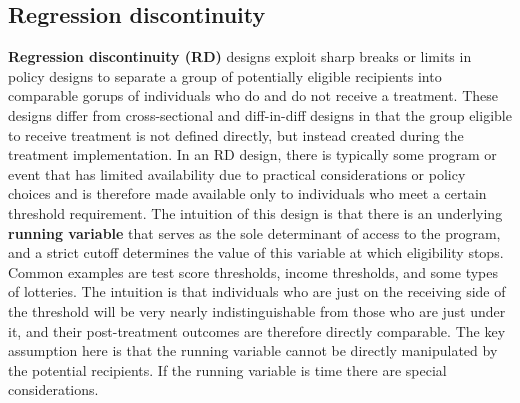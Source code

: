 \subsection{Regression discontinuity}

\textbf{Regression discontinuity (RD)} designs exploit sharp breaks or limits
in policy designs to separate a group of potentially eligible recipients
into comparable gorups of individuals who do and do not receive a treatment.
These designs differ from cross-sectional and diff-in-diff designs
in that the group eligible to receive treatment is not defined directly,
but instead created during the treatment implementation.
In an RD design, there is typically some program or event
that has limited availability due to practical considerations or policy choices
and is therefore made available only to individuals who meet a certain threshold requirement.
The intuition of this design is that there is an underlying \textbf{running variable}
that serves as the sole determinant of access to the program,
and a strict cutoff determines the value of this variable at which eligibility stops.\cite{imbens2008regression}
Common examples are test score thresholds, income thresholds, and some types of lotteries.
The intuition is that individuals who are just on the receiving side of the threshold
will be very nearly indistinguishable from those who are just under it,
and their post-treatment outcomes are therefore directly comparable.\cite{lee2010regression}
The key assumption here is that the running variable cannot be directly manipulated
by the potential recipients.
If the running variable is time there are special considerations.\cite{hausman2018regression}


